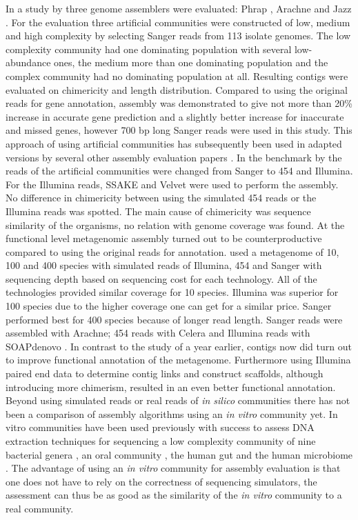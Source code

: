 \documentclass[a4paper,12pt]{article}
\begin{document}
In a study by \citet{Mavromatis17468765} three genome assemblers were
evaluated: Phrap \cite{delaBastide18428783}, Arachne \cite{Batzoglou11779843}
and Jazz \cite{Aparicio12142439}. For the evaluation three artificial
communities were constructed of low, medium and high complexity by selecting
Sanger reads from 113 isolate genomes. The low complexity community had one
dominating population with several low-abundance ones, the medium more than one
dominating population and the complex community had no dominating population at
all. Resulting contigs were evaluated on chimericity and length distribution.
Compared to using the original reads for gene annotation, assembly was
demonstrated to give not more than 20\% increase in accurate gene prediction
and a slightly better increase for inaccurate and missed genes, however 700 bp
long Sanger reads were used in this study.  This approach of using artificial
communities has subsequently been used in adapted versions by several other
assembly evaluation papers \cite{Pignatelli21625384,Mende22384016}. In the
benchmark by \citet{Pignatelli21625384} the reads of the artificial communities
were changed from Sanger to 454 and Illumina. For the Illumina reads, SSAKE
\cite{Warren17158514} and Velvet were used to perform the assembly.  No
difference in chimericity between using the simulated 454 reads or the Illumina
reads was spotted. The main cause of chimericity was sequence similarity of the
organisms, no relation with genome coverage was found. At the functional level
metagenomic assembly turned out to be counterproductive compared to using the
original reads for annotation. \citet{Mende22384016} used a metagenome of 10,
100 and 400 species with simulated reads of Illumina, 454 and Sanger with
sequencing depth based on sequencing cost for each technology. All of the
technologies provided similar coverage for 10 species. Illumina was superior
for 100 species due to the higher coverage one can get for a similar price.
Sanger performed best for 400 species because of longer read length. Sanger
reads were assembled with Arachne; 454 reads with Celera \cite{Myers10731133}
and Illumina reads with SOAPdenovo \cite{Li20019144}. In contrast to the study
of \citet{Pignatelli21625384} a year earlier, contigs now did turn out to
improve functional annotation of the metagenome. Furthermore using Illumina
paired end data to determine contig links and construct scaffolds, although
introducing more chimerism, resulted in an even better functional annotation.
Beyond using simulated reads or real reads of {\em in silico } communities
there has not been a comparison of assembly algorithms using an {\em in vitro }
community yet.  In vitro communities have been used previously with success to
assess DNA extraction techniques for sequencing a low complexity community of
nine bacterial genera \cite{Willner22514642}, an oral community
\cite{Diaz22520388}, the human gut \cite{Wu20673359} and the human microbiome
\cite{HMPC22699610}.  The advantage of using an {\em in vitro } community for
assembly evaluation is that one does not have to rely on the correctness of
sequencing simulators, the assessment can thus be as good as the similarity of
the {\em in vitro } community to a real community.
\end{document}
